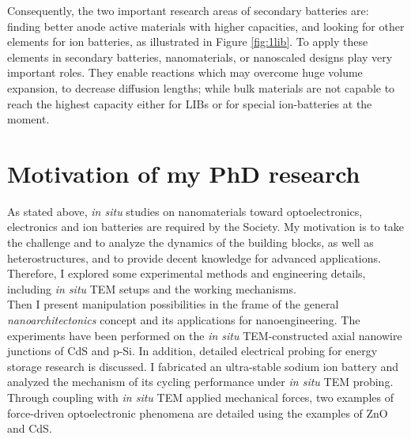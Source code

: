 Consequently, the two important research areas of secondary batteries are: finding better anode active materials with higher capacities, and looking for other elements for ion batteries, as illustrated in Figure \ref{fig:1lib}. To apply these elements in secondary batteries, nanomaterials, or nanoscaled designs play very important roles. They enable reactions which may overcome huge volume expansion, to decrease diffusion lengths; while bulk materials are not capable to reach the highest capacity either for LIBs or for special ion-batteries at the moment. 

\section{Motivation of my PhD research}
As stated above, {\em in situ} studies on nanomaterials toward optoelectronics, electronics and ion batteries are required by the Society. My motivation is to take the challenge and to analyze the dynamics of the building blocks, as well as heterostructures, and to provide decent knowledge for advanced applications. 
Therefore, I explored some experimental methods and engineering details, including {\em in situ} TEM setups and the working mechanisms. \\
Then I present manipulation possibilities in the frame of the general \textit{nanoarchitectonics} concept and its applications for nanoengineering. The experiments have been performed on the {\em in situ} TEM-constructed axial nanowire junctions of CdS and p-Si. In addition, detailed electrical probing for energy storage research is discussed. I fabricated an ultra-stable sodium ion battery and analyzed the mechanism of its cycling performance under {\em in situ} TEM probing. Through coupling with {\em in situ} TEM applied mechanical forces, two examples of force-driven optoelectronic phenomena are detailed using the examples of ZnO and CdS. 